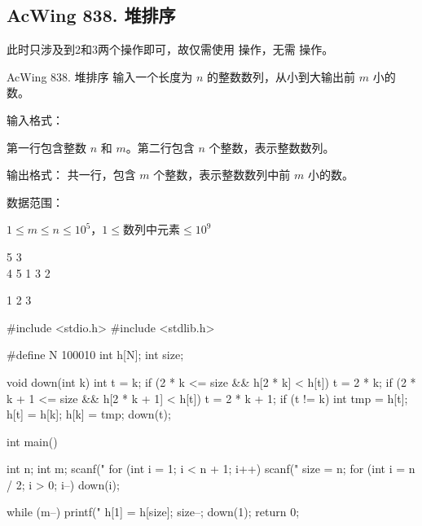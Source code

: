 \subsection{AcWing 838. 堆排序}
此时只涉及到2和3两个操作即可，故仅需使用  操作，无需  操作。

\begin{titledbox}{AcWing 838. 堆排序}
    输入一个长度为 $n$ 的整数数列，从小到大输出前 $m$ 小的数。

    输入格式：

    第一行包含整数 $n$ 和 $m$。第二行包含 $n$ 个整数，表示整数数列。

    输出格式：
    共一行，包含 $m$ 个整数，表示整数数列中前 $m$ 小的数。

    数据范围：

    $1 \le m \le n \le 10^5$，$1 \le 数列中元素 \le 10^9$

    \begin{inputblock}
        5 3 \\
        4 5 1 3 2
    \end{inputblock}
    \begin{outputblock}
        1 2 3
    \end{outputblock}

\end{titledbox}

\begin{mycpptwocol}[堆排序]
    #include <stdio.h>
    #include <stdlib.h>

    #define N 100010
    int h[N];
    int size;

    void down(int k) {
        int t = k;
        if (2 * k <= size && h[2 * k] < h[t]) {
            t = 2 * k;
        }
        if (2 * k + 1 <= size && h[2 * k + 1] < h[t]) {
            t = 2 * k + 1;
        }
        if (t != k) {
            int tmp = h[t];
            h[t] = h[k];
            h[k] = tmp;
            down(t);
        }
    }

    int main() {
        int n;
        int m;
        scanf("%
        for (int i = 1; i < n + 1; i++) {
            scanf("%
        }
        size = n;
        for (int i = n / 2; i > 0; i--) {
            down(i);
        }

        while (m--) {
            printf("%
            h[1] = h[size];
            size--;
            down(1);
        }
        return 0;
    }
\end{mycpptwocol}

